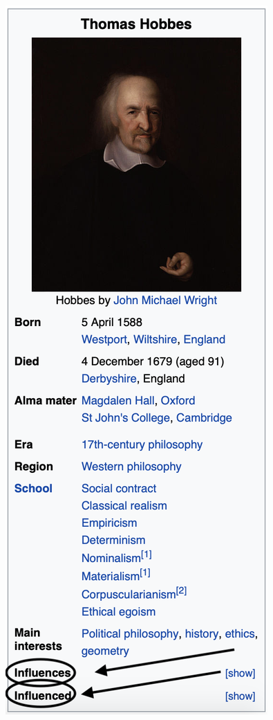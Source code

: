 \documentclass[12pt, twoside]{article}
\begin{document}
\begin{figure}[htp]
\begin{minipage}[t]{0.5\linewidth}
\centering
	\includegraphics[width = .5\textwidth]{images/hobbes}
\end{minipage}
\begin{minipage}[t]{0.5\linewidth}
\vspace{-260pt}
\centering

\end{minipage}
\end{figure}
\end{document}
